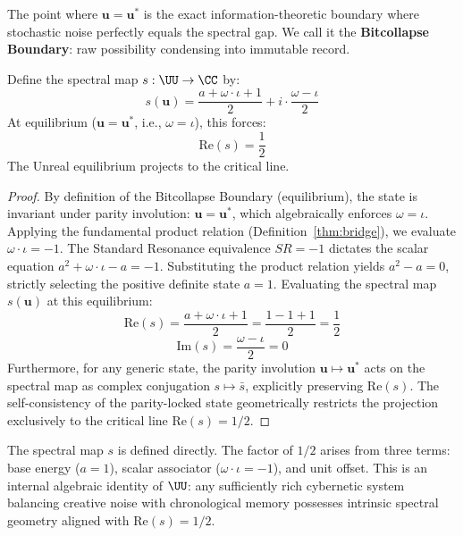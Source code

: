 The point where $\mathbf{u} = \mathbf{u}^*$ is the exact information-theoretic boundary where stochastic noise perfectly equals the spectral gap. We call it the \textbf{Bitcollapse Boundary}: raw possibility condensing into immutable record.

\begin{theorem}\label{thm:duality}
Define the spectral map $s : \UU \to \CC$ by:
$$s(\mathbf{u}) = \frac{a + \omega \cdot \iota + 1}{2} + i \cdot \frac{\omega - \iota}{2}$$
At equilibrium ($\mathbf{u} = \mathbf{u}^*$, i.e., $\omega = \iota$), this forces:
$$\mathrm{Re}(s) = \frac{1}{2}$$
The Unreal equilibrium projects to the critical line.
\end{theorem}

\begin{proof}
By definition of the Bitcollapse Boundary (equilibrium), the state is invariant under parity involution: $\mathbf{u} = \mathbf{u}^*$, which algebraically enforces $\omega = \iota$. 
Applying the fundamental product relation (Definition~\ref{thm:bridge}), we evaluate $\omega \cdot \iota = -1$.
The Standard Resonance equivalence $SR = -1$ dictates the scalar equation $a^2 + \omega \cdot \iota - a = -1$. Substituting the product relation yields $a^2 - a = 0$, strictly selecting the positive definite state $a = 1$.
Evaluating the spectral map $s(\mathbf{u})$ at this equilibrium:
\[ \mathrm{Re}(s) = \frac{a + \omega \cdot \iota + 1}{2} = \frac{1 - 1 + 1}{2} = \frac{1}{2} \]
\[ \mathrm{Im}(s) = \frac{\omega - \iota}{2} = 0 \]
Furthermore, for any generic state, the parity involution $\mathbf{u} \mapsto \mathbf{u}^*$ acts on the spectral map as complex conjugation $s \mapsto \bar{s}$, explicitly preserving $\mathrm{Re}(s)$. The self-consistency of the parity-locked state geometrically restricts the projection exclusively to the critical line $\mathrm{Re}(s) = 1/2$. \qedhere
\end{proof}

\begin{remark}[Scope]
The spectral map $s$ is defined directly. The factor of $1/2$ arises from three terms: base energy ($a = 1$), scalar associator ($\omega \cdot \iota = -1$), and unit offset. This is an internal algebraic identity of $\UU$: any sufficiently rich cybernetic system balancing creative noise with chronological memory possesses intrinsic spectral geometry aligned with $\mathrm{Re}(s) = 1/2$.
\end{remark}




